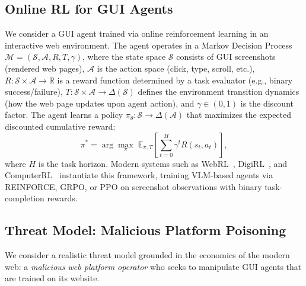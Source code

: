 \documentclass{article}
\begin{document}
\subsection{Online RL for GUI Agents}

We consider a GUI agent trained via online reinforcement learning in an interactive web environment.
The agent operates in a Markov Decision Process $\mathcal{M} = (\mathcal{S}, \mathcal{A}, R, T, \gamma)$, where the state space $\mathcal{S}$ consists of GUI screenshots (rendered web pages), $\mathcal{A}$ is the action space (click, type, scroll, etc.), $R: \mathcal{S} \times \mathcal{A} \rightarrow \mathbb{R}$ is a reward function determined by a task evaluator (e.g., binary success/failure), $T: \mathcal{S} \times \mathcal{A} \rightarrow \Delta(\mathcal{S})$ defines the environment transition dynamics (how the web page updates upon agent action), and $\gamma \in (0,1)$ is the discount factor.
The agent learns a policy $\pi_\theta: \mathcal{S} \rightarrow \Delta(\mathcal{A})$ that maximizes the expected discounted cumulative reward:
\begin{equation}
    \pi^* = \arg\max_{\pi} \; \mathbb{E}_{\pi, T}\left[\sum_{t=0}^{H}
    \gamma^t R(s_t, a_t)\right],
\end{equation}
where $H$ is the task horizon.
Modern systems such as WebRL~\citep{qi2024webrl}, DigiRL~\citep{bai2024digirl}, and ComputerRL~\citep{lai2025computerrl} instantiate this framework, training VLM-based agents via REINFORCE, GRPO, or PPO on screenshot observations with binary task-completion rewards.

\subsection{Threat Model: Malicious Platform Poisoning}

We consider a realistic threat model grounded in the economics of the modern web: a \emph{malicious web platform operator} who seeks to manipulate GUI agents that are trained on its website.
\end{document}
